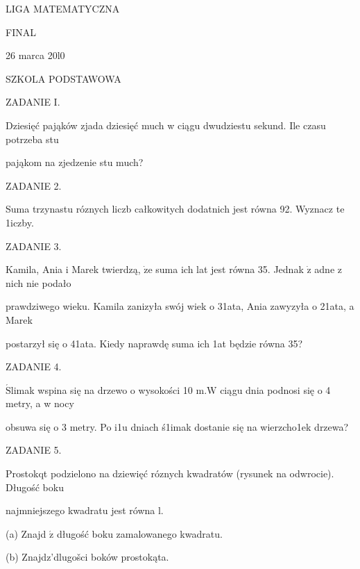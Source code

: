 \documentclass[a4paper,12pt]{article}
\begin{document}
LIGA MATEMATYCZNA

FINAL

26 marca 20l0

SZKOLA PODSTAWOWA

ZADANIE I.

Dziesięć pająków zjada dziesięć much w ciągu dwudziestu sekund. Ile czasu potrzeba stu

pająkom na zjedzenie stu much?

ZADANIE 2.

Suma trzynastu róznych liczb całkowitych dodatnich jest równa 92. Wyznacz te 1iczby.

ZADANIE 3.

Kamila, Ania i Marek twierdzą, $\dot{\mathrm{z}}\mathrm{e}$ suma ich lat jest równa 35. Jednak $\dot{\mathrm{z}}$ adne z nich nie podało

prawdziwego wieku. Kamila zanizyła swój wiek o 31ata, Ania zawyzyła o 21ata, a Marek

postarzył się o 41ata. Kiedy naprawdę suma ich 1at będzie równa 35?

ZADANIE 4.

$\acute{\mathrm{S}}$limak wspina się na drzewo o wysokości 10 $\mathrm{m}. \mathrm{W}$ ciągu dnia podnosi się o 4 metry, a w nocy

obsuwa się o 3 metry. Po i1u dniach ś1imak dostanie się na wierzcho1ek drzewa?

ZADANIE 5.

Prostokqt podzielono na dziewięć róznych kwadratów (rysunek na odwrocie). Długość boku

najmniejszego kwadratu jest równa l.

(a) Znajd $\acute{\mathrm{z}}$ długość boku zamalowanego kwadratu.

(b) Znajdz'dlugošci boków prostokąta.
\end{document}
